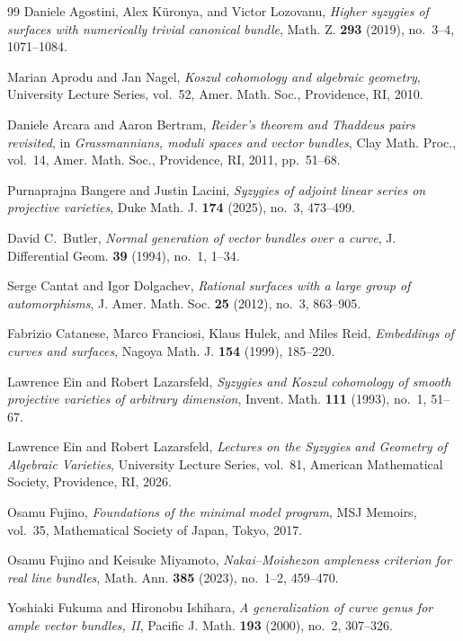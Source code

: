 \documentclass[11pt,reqno]{amsart}
\numberwithin{equation}{section}
\theoremstyle{remark}
\begin{document}
\begin{thebibliography}{99}
Daniele Agostini, Alex K{\"u}ronya, and Victor Lozovanu,
\emph{Higher syzygies of surfaces with numerically trivial canonical bundle},
Math. Z. \textbf{293} (2019), no.~3--4, 1071--1084.

Marian Aprodu and Jan Nagel,
\emph{Koszul cohomology and algebraic geometry},
University Lecture Series, vol.~52,
Amer. Math. Soc., Providence, RI, 2010.

Daniele Arcara and Aaron Bertram,
\emph{Reider's theorem and Thaddeus pairs revisited},
in \emph{Grassmannians, moduli spaces and vector bundles},
Clay Math. Proc., vol.~14,
Amer. Math. Soc., Providence, RI, 2011, pp.~51--68.

Purnaprajna Bangere and Justin Lacini,
\emph{Syzygies of adjoint linear series on projective varieties},
Duke Math. J. \textbf{174} (2025), no.~3, 473--499.

David C.~Butler,
\emph{Normal generation of vector bundles over a curve},
J. Differential Geom. \textbf{39} (1994), no.~1, 1--34.

Serge Cantat and Igor Dolgachev,
\emph{Rational surfaces with a large group of automorphisms},
J. Amer. Math. Soc. \textbf{25} (2012), no.~3, 863--905.

Fabrizio Catanese, Marco Franciosi, Klaus Hulek, and Miles Reid,
\emph{Embeddings of curves and surfaces},
Nagoya Math. J. \textbf{154} (1999), 185--220.

Lawrence Ein and Robert Lazarsfeld,
\emph{Syzygies and {K}oszul cohomology of smooth projective
varieties of arbitrary dimension},
Invent. Math. \textbf{111} (1993), no.~1, 51--67.

Lawrence Ein and Robert Lazarsfeld,
\emph{Lectures on the Syzygies and Geometry of Algebraic Varieties},
University Lecture Series, vol.~81,
American Mathematical Society, Providence, RI, 2026.

Osamu Fujino,
\emph{Foundations of the minimal model program},
MSJ Memoirs, vol.~35,
Mathematical Society of Japan, Tokyo, 2017.

Osamu Fujino and Keisuke Miyamoto,
\emph{Nakai--Moishezon ampleness criterion for real line bundles},
Math. Ann. \textbf{385} (2023), no.~1--2, 459--470.

Yoshiaki Fukuma and Hironobu Ishihara,
\emph{A generalization of curve genus for ample vector bundles, II},
Pacific J. Math. \textbf{193} (2000), no.~2, 307--326.


\end{thebibliography}
\end{document}
